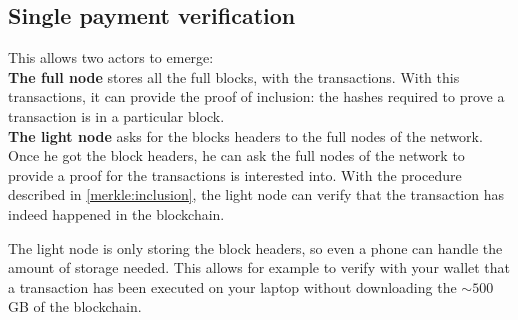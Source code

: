 \subsection{Single payment verification}
This allows two actors to emerge: \\
\textbf{The full node} stores all the full blocks, with the transactions. With this transactions, it can provide the proof of inclusion: the hashes required to prove a transaction is in a particular block. \\
\textbf{The light node } asks for the blocks headers to the full nodes of the network. Once he got the block headers, he can ask the full nodes of the network to provide a proof for the transactions is interested into. With the procedure described in \ref{merkle:inclusion}, the light node can verify that the transaction has indeed happened in the blockchain.

The light node is only storing the block headers, so even a phone can handle the amount of storage needed. This allows for example to verify with your wallet that a transaction has been executed  on your laptop without downloading the $\sim 500$GB of the blockchain.


